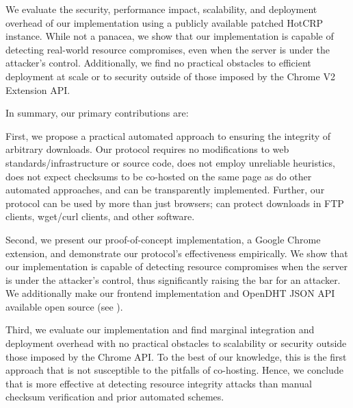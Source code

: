 We evaluate the security, performance impact, scalability, and deployment
overhead of our implementation using a publicly available patched HotCRP
instance. While not a panacea, we show that our implementation is capable of
detecting real-world resource compromises, even when the server is under the
attacker's control. Additionally, we find no practical obstacles to efficient
deployment at scale or to security outside of those imposed by the Chrome V2
Extension API.

In summary, our primary contributions are:

First, we propose a practical automated approach to ensuring the integrity of
arbitrary downloads. Our protocol requires no modifications to web
standards/infrastructure or source code, does not employ unreliable heuristics,
does not expect checksums to be co-hosted on the same page as do other automated
approaches, and can be transparently implemented. Further, our protocol can be
used by more than just browsers; \SYSTEM{} can protect downloads in FTP clients,
wget/curl clients, and other software.

Second, we present our proof-of-concept implementation, a Google Chrome
extension, and demonstrate our protocol's effectiveness empirically. We show
that our implementation is capable of detecting resource compromises when the
server is under the attacker's control, thus significantly raising the bar for
an attacker. We additionally make our frontend implementation and OpenDHT JSON
API available open source (see ).

Third, we evaluate our implementation and find marginal integration and
deployment overhead with no practical obstacles to scalability or security
outside those imposed by the Chrome API. To the best of our knowledge,
this is the first approach that is not susceptible to the pitfalls of
co-hosting. Hence, we conclude that \SYSTEM{} is more effective at detecting
resource integrity attacks than manual checksum verification and prior automated
schemes.
